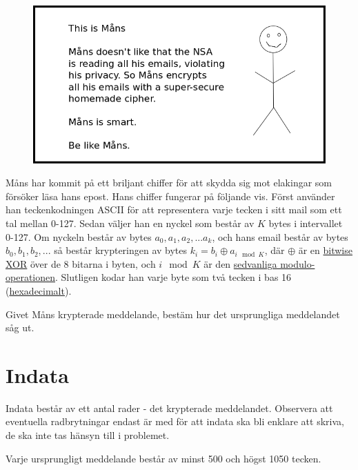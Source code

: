
\begin{center}
  \begin{figure}[h!]
    \includegraphics[width=\textwidth]{mans.png}
  \end{figure}
\end{center}

Måns har kommit på ett briljant chiffer för att skydda sig mot elakingar som försöker läsa hans epost. Hans chiffer fungerar på följande vis. Först använder han teckenkodningen ASCII för att representera varje tecken i sitt mail som ett tal mellan 0-127. Sedan väljer han en nyckel som består av $K$ bytes i intervallet 0-127. Om nyckeln består av bytes $a_0, a_1, a_2, ... a_k$, och hans email består av bytes $b_0, b_1, b_2, ...$ så består krypteringen
av bytes $k_i = b_i \oplus a_{i \mod K}$, där $\oplus$ är en \href{https://en.wikipedia.org/wiki/Bitwise\_operation#XOR}{bitwise XOR} över de 8 bitarna i byten, och $i \mod K$ är den \href{https://en.wikipedia.org/wiki/Modulo\_operation}{sedvanliga modulo-operationen}. Slutligen kodar han varje byte som två tecken i bas 16 (\href{https://en.wikipedia.org/wiki/Hexadecimal}{hexadecimalt}).

Givet Måns krypterade meddelande, bestäm hur det ursprungliga meddelandet såg ut.

\section*{Indata}
Indata består av ett antal rader - det krypterade meddelandet. Observera att eventuella radbrytningar endast är med för att indata ska bli enklare att skriva, de ska inte tas hänsyn till i problemet.

Varje ursprungligt meddelande består av minst 500 och högst 1050 tecken.

